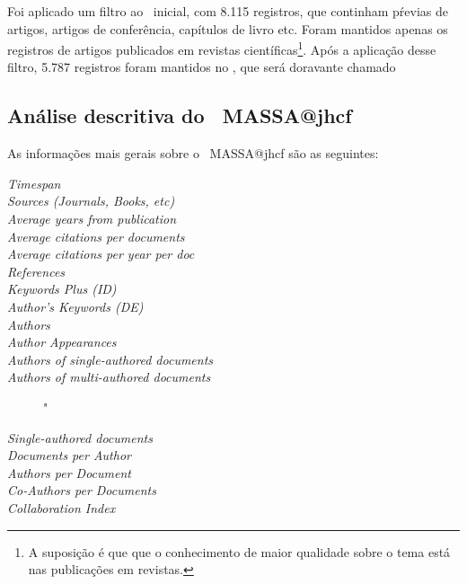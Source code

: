 Foi aplicado um filtro ao \dataset\   inicial, com 8.115 registros, que continham pŕevias de artigos, artigos de conferência, capítulos de livro etc. Foram mantidos apenas os registros de artigos publicados em revistas científicas\footnote{A suposição é que que o conhecimento de maior qualidade sobre o tema está nas publicações em revistas.}. Após a aplicação desse filtro, 5.787 registros foram mantidos no \dataset, que será doravante chamado

\subsection{Análise descritiva do \dataset\   MASSA@jhcf}


As informações mais gerais sobre o \dataset\   MASSA@jhcf são as seguintes:
\begin{description}
    \item [\textit{Timespan}] 
    \item [\textit{Sources (Journals, Books, etc)}] 
    \item [\textit{Average years from publication}] 
    \item [\textit{Average citations per documents}] 
    \item [\textit{Average citations per year per doc}] 
    \item [\textit{References}] 
    \item [\textit{Keywords Plus (ID)}] 
    \item [\textit{Author's Keywords (DE)}] 
    \item [\textit{Authors}]  
    \item [\textit{Author Appearances}] 
    \item [\textit{Authors of single-authored documents}] 
    \item [\textit{Authors of multi-authored documents}] "
    \item [\textit{Single-authored documents}] 
    \item [\textit{Documents per Author}] 
    \item [\textit{Authors per Document}] 
    \item [\textit{Co-Authors per Documents}] 
    \item [\textit{Collaboration Index}] 
\end{description}
